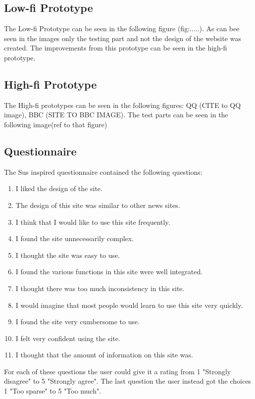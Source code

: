 \subsection{Low-fi Prototype}
The Low-fi Prototype can be seen in the following figure (fig:.....). As can bee seen in the images only the testing part and not the design of the website was created. The improvements from this prototype can be seen in the high-fi prototype.

\subsection{High-fi Prototype}
The High-fi prototypes can be seen in the following figures: QQ (CITE to QQ image), BBC (SITE TO BBC IMAGE). The test parts can be seen in the following image(ref to that figure)

\subsection{Questionnaire}
The Sus inspired questionnaire contained the following questions:
\begin{enumerate}
	\item I liked the design of the site.
	\item The design of this site was similar to other news sites.
	\item I think that I would like to use this site frequently.
	\item I found the site unnecessarily complex.
	\item I thought the site was easy to use.
	\item I found the various functions in this site were well integrated.
	\item I thought there was too much inconsistency in this site.
	\item I would imagine that most people would learn to use this site very quickly.
	\item I found the site very cumbersome to use.
	\item I felt very confident using the site.
	\item I thought that the amount of information on this site was.
\end{enumerate}
For each of these questions the user could give it a rating from 1 "Strongly disagree" to 5 "Strongly agree". The last question the user instead got the choices 1 "Too sparse" to 5 "Too much".

